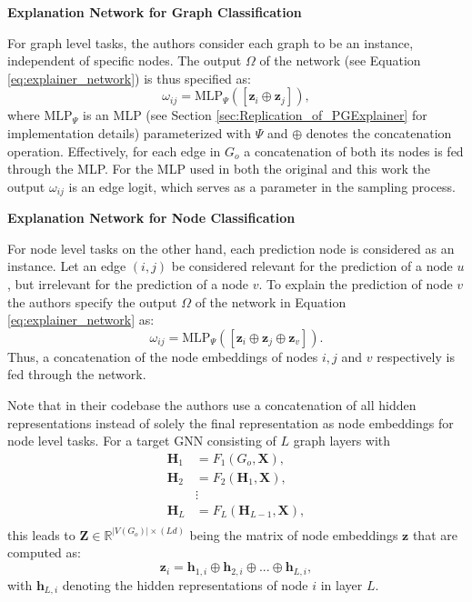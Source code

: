 \textbf{Explanation Network for Graph Classification}\par
For graph level tasks, the authors consider each graph to be an instance, independent  of specific nodes. The output $\Omega$ of the network (see Equation \ref{eq:explainer_network}) is thus specified as:
\begin{equation}
    \label{eq:mlp_graph_input}
    \omega_{ij} = \text{MLP}_\Psi ([\mathbf{z}_i\oplus\mathbf{z}_j]),
\end{equation}
where $\text{MLP}_\Psi$ is an MLP (see Section \ref{sec:Replication_of_PGExplainer} for implementation details) parameterized with $\Psi$ and $\oplus$ denotes the concatenation operation. Effectively, for each edge in $G_o$ a concatenation of both its nodes is fed through the MLP. For the MLP used in both the original and this work the output $\omega_{ij}$ is an edge logit, which serves as a parameter in the sampling process. \bigskip

\textbf{Explanation Network for Node Classification}\par
For node level tasks on the other hand, each prediction node is considered as an instance. Let an edge $(i,j)$ be considered relevant for the prediction of a node $u$, but irrelevant for the prediction of a node $v$. To explain the prediction of node $v$ the authors specify the output $\Omega$ of the network in Equation \ref{eq:explainer_network} as:
\begin{equation}
    \omega_{ij} = \text{MLP}_\Psi ([\mathbf{z}_i\oplus\mathbf{z}_j\oplus\mathbf{z}_v]).
\end{equation}
Thus, a concatenation of the node embeddings of nodes $i, j$ and $v$ respectively is fed through the network.

Note that in their codebase the authors use a concatenation of all hidden representations instead of solely the final representation as node embeddings for node level tasks.
For a target GNN consisting of $L$ graph layers with
\begin{align*}
    \mathbf{H}_1 &= F_1(G_o, \mathbf{X}), \\
    \mathbf{H}_2 &= F_2(\mathbf{H}_1, \mathbf{X}), \\
    &\vdots \\
    \mathbf{H}_L &= F_L(\mathbf{H}_{L-1}, \mathbf{X}), \\
\end{align*}
this leads to $\mathbf{Z} \in \mathbb{R}^{|V(G_o)|\times (Ld)}$ being the matrix of node embeddings $\mathbf{z}$ that are computed as:
\begin{equation}
    \mathbf{z}_i = \mathbf{h}_{1,i} \oplus \mathbf{h}_{2,i} \oplus ... \oplus \mathbf{h}_{L,i},
\end{equation}
with $\mathbf{h}_{L,i}$ denoting the hidden representations of node $i$ in layer $L$.\bigskip

